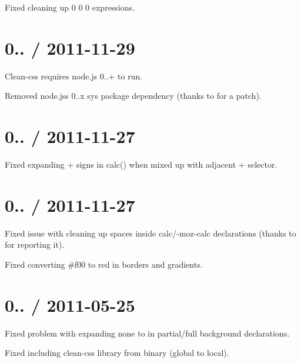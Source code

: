 \begin{DoxyItemize}
\item Fixed cleaning up { 0 0 0} expressions.
\end{DoxyItemize}

\section*{0.. / 2011-\/11-\/29 }


\begin{DoxyItemize}
\item Clean-\/css requires node.\+js 0..+ to run.
\item Removed node.\+js\textquotesingle{}s 0..\+x \textquotesingle{}sys\textquotesingle{} package dependency (thanks to \href{https://github.com/jmalonzo}{\tt } for a patch).
\end{DoxyItemize}

\section*{0.. / 2011-\/11-\/27 }


\begin{DoxyItemize}
\item Fixed expanding {\ttfamily +} signs in {\ttfamily calc()} when mixed up with adjacent {\ttfamily +} selector.
\end{DoxyItemize}

\section*{0.. / 2011-\/11-\/27 }


\begin{DoxyItemize}
\item Fixed issue with cleaning up spaces inside {\ttfamily calc}/{\ttfamily -\/moz-\/calc} declarations (thanks to \href{https://github.com/cvan}{\tt } for reporting it).
\item Fixed converting {\ttfamily \#f00} to {\ttfamily red} in borders and gradients.
\end{DoxyItemize}

\section*{0.. / 2011-\/05-\/25 }


\begin{DoxyItemize}
\item Fixed problem with expanding {\ttfamily none} to {} in partial/full background declarations.
\item Fixed including clean-\/css library from binary (global to local).
\end{DoxyItemize}

